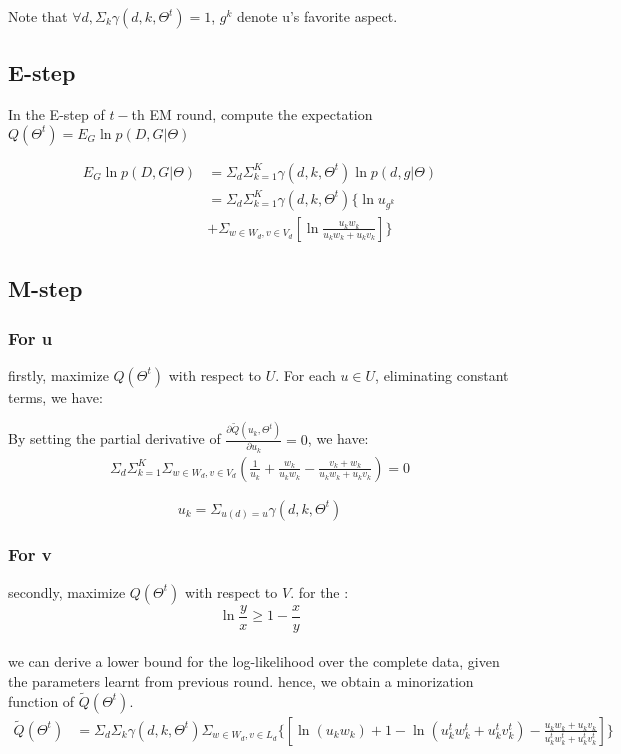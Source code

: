 \documentclass{article}
\begin{document}
Note that $\forall d, \Sigma_k \gamma(d,k,\Theta^t)=1$, $g^k$ denote u's favorite aspect.

\subsection{E-step}
 In the E-step of $t-$th  EM round, compute the expectation $Q(\Theta^t)=E_{G} \ln p(D,G|\Theta) $

\begin{align}\label{equ:estep}
E_{G} \ln p(D,G|\Theta) & =\Sigma_{d} \Sigma_{k=1}^K \gamma(d,k,\Theta^t) \ln p(d,g|\Theta)\\ \nonumber
& = \Sigma_d \Sigma_{k=1}^K \gamma(d,k,\Theta^t) \{ \ln u_{g^k}  \\ \nonumber
&+ \Sigma_{w\in W_d, v\in V_d}[\ln \frac{u_k w_k}{u_k w_k+u_k v_k}] \}
\end{align}

\subsection{M-step}
\subsubsection{For u}
firstly, maximize $Q(\Theta^t)$ with respect to $U$. For each $u \in U$, eliminating constant terms, we have:

By setting the partial derivative of $\frac{\partial \tilde{Q}(u_k,\Theta^t)}{\partial u_k}=0$, we have:
\begin{align}
\Sigma_{d} \Sigma_{k=1}^K \Sigma_{w\in W_d, v\in V_d}(\frac{1}{u_k}+\frac{ w_k}{u_k w_k}-\frac{v_k+w_k}{u_k w_k+u_k v_k}) = 0
\end{align}

\begin{equation}
u_k =\Sigma_{u(d)=u}\gamma(d,k,\Theta^t)
\end{equation}

\subsubsection{For v}
secondly, maximize $Q(\Theta^t)$ with respect to $V$.
for the :
\begin{equation*}
\ln \frac{y}{x} \geq 1- \frac{x}{y}
\end{equation*}\\
we can derive a lower bound for the log-likelihood over the complete data, given the parameters learnt from previous round.
hence, we obtain a minorization function of $\tilde{Q}(\Theta^t)$.\\
\begin{equation}
\begin{aligned}
\tilde{Q}(\Theta^t) &=\Sigma_d \Sigma_k \gamma(d,k,\Theta^t) \Sigma_{w\in W_d, v\in L_d}  \{[\ln (u_k w_k) + 1 - \ln (u_k^t w_k^t+u_k^t v_k^t) - \frac{u_k w_k+u_k v_k}{u_k^t w_k^t+u_k^t v_k^t}]\}
\end{aligned}
\end{equation}
\end{document}
